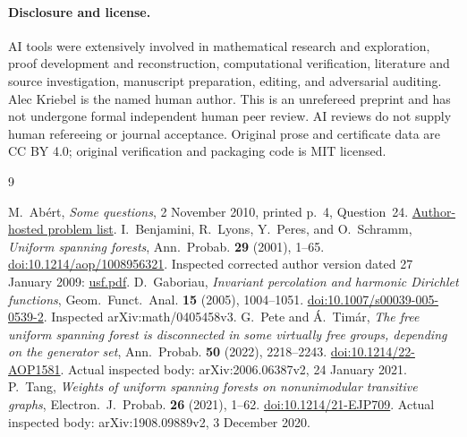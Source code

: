 \documentclass[11pt]{article}
\theoremstyle{remark}\newtheorem{remark}[theorem]{Remark}
\begin{document}
\paragraph{Disclosure and license.}
AI tools were extensively involved in mathematical research and
exploration, proof development and reconstruction, computational
verification, literature and source investigation, manuscript preparation,
editing, and adversarial auditing.
Alec Kriebel is the named human author.
This is an unrefereed preprint and has not undergone formal independent
human peer review. AI reviews do not supply human refereeing or journal
acceptance. Original prose and certificate data are CC BY 4.0;
original verification and packaging code is MIT licensed.

\begin{thebibliography}{9}
\raggedright
{}
M.~Ab\'ert, \emph{Some questions}, 2 November 2010,
printed p.~4, Question~24.
\href{https://www.renyi.hu/~abert/questions.pdf}{Author-hosted problem list}.
I.~Benjamini, R.~Lyons, Y.~Peres, and O.~Schramm,
\emph{Uniform spanning forests},
Ann.~Probab. \textbf{29} (2001), 1--65.
\href{https://doi.org/10.1214/aop/1008956321}{doi:10.1214/aop/1008956321}.
Inspected corrected author version dated 27 January 2009:
\href{https://rdlyons.pages.iu.edu/pdf/usf.pdf}{usf.pdf}.
D.~Gaboriau, \emph{Invariant percolation and harmonic Dirichlet functions},
Geom.~Funct.~Anal. \textbf{15} (2005), 1004--1051.
\href{https://doi.org/10.1007/s00039-005-0539-2}{doi:10.1007/s00039-005-0539-2}.
Inspected arXiv:math/0405458v3.
G.~Pete and \'A.~Tim\'ar,
\emph{The free uniform spanning forest is disconnected in some virtually
free groups, depending on the generator set},
Ann.~Probab. \textbf{50} (2022), 2218--2243.
\href{https://doi.org/10.1214/22-AOP1581}{doi:10.1214/22-AOP1581}.
Actual inspected body: arXiv:2006.06387v2, 24 January 2021.
P.~Tang,
\emph{Weights of uniform spanning forests on nonunimodular transitive graphs},
Electron.~J.~Probab. \textbf{26} (2021), 1--62.
\href{https://doi.org/10.1214/21-EJP709}{doi:10.1214/21-EJP709}.
Actual inspected body: arXiv:1908.09889v2, 3 December 2020.
\end{thebibliography}
\end{document}
